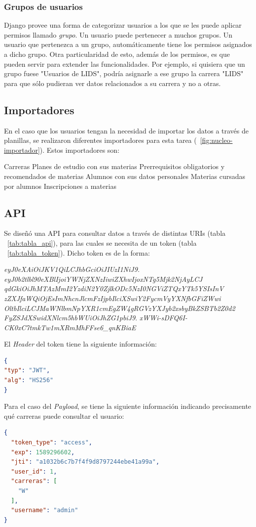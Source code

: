 \subsubsection{Grupos de usuarios}

Django provee una forma de categorizar usuarios a los que se les puede aplicar permisos llamado \textit{grupo}. Un usuario puede pertenecer a muchos grupos.
Un usuario que pertenezca a un grupo, automáticamente tiene los permisos asignados a dicho grupo.
Otra particularidad de esto, además de los permisos, es que pueden servir para extender las funcionalidades. Por ejemplo, si quisiera que un grupo fuese "Usuarios de LIDS", podría asignarle a ese grupo la carrera "LIDS" para que sólo pudieran ver datos relacionados a su carrera y no a otras.


\subsection{Importadores}

En el caso que los usuarios tengan la necesidad de importar los datos a través de planillas, se realizaron diferentes importadores para esta tarea (~\ref{fig:nucleo-importador}).
Estos importadores son:
\begin{outline}
\2 Carreras
\2 Planes de estudio con sus materias
\2 Prerrequisitos obligatorios y recomendados de materias
\2 Alumnos con sus datos personales
\2 Materias cursadas por alumnos
\2 Inscripciones a materias
\end{outline}

\subsection{API}

Se diseñó una API para consultar datos a través de distintas URIs (tabla ~\ref{tab:tabla_api}), para las cuales se necesita de un token (tabla ~\ref{tab:tabla_token}).
Dicho token es de la forma:

\textit{eyJ0eXAiOiJKV1QiLCJhbGciOiJIUzI1NiJ9.} \break 
\textit{eyJ0b2tlbl90eXBlIjoiYWNjZXNzIiwiZXhwIjoxNTg5Mjk2NjAyLCJ}\break 
\textit{qdGkiOiJhMTAzMmI2YzdiN2Y0ZjlkODc5NzI0NGViZTQxYTk5YSIsInV}\break 
\textit{zZXJfaWQiOjEsImNhcnJlcmFzIjpbIlciXSwiY2FycmVyYXNfbGFiZWwi} \break \textit{OltbIlciLCJMaWNlbmNpYXR1cmEgZW4gRGVzYXJyb2xsbyBkZSBTb2Z0d2}\break 
\textit{FyZSJdXSwidXNlcm5hbWUiOiJhZG1pbiJ9}.\break 
\textit{xWWi-sDFQ6I-CK0xC7tmkTw1mXRmMhFFse6\_qnKBiaE}

\break
El \textit{Header} del token tiene la siguiente información:
\begin{lstlisting}[language=json,firstnumber=1]
{
"typ": "JWT",
"alg": "HS256"
}
\end{lstlisting}
\break
Para el caso del \textit{Payload}, se tiene la siguiente información indicando precisamente qué carreras puede consultar el usuario:
\begin{lstlisting}[language=json,firstnumber=1]
{
  "token_type": "access",
  "exp": 1589296602,
  "jti": "a1032b6c7b7f4f9d8797244ebe41a99a",
  "user_id": 1,
  "carreras": [
    "W"
  ],
  "username": "admin"
}
\end{lstlisting}

